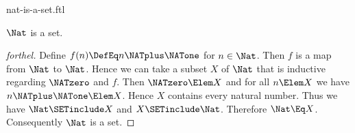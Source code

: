 \documentclass{stex}
\begin{document}
\begin{smodule}{nat-is-a-set.ftl}

\begin{proposition}[forthel]
  $\Nat$ is a set.
\end{proposition}
\begin{proof}[forthel]
  Define $f(n) \DefEq n \NATplus \NATone$ for $n \in \Nat$.
  Then $f$ is a map from $\Nat$ to $\Nat$.
  Hence we can take a subset $X$ of $\Nat$ that is inductive regarding
  $\NATzero$ and $f$.
  Then $\NATzero \Elem X$ and for all $n \Elem X$ we have $n \NATplus \NATone \Elem X$.
  Hence $X$ contains every natural number.
  Thus we have $\Nat \SETinclude X$ and $X \SETinclude \Nat$.
  Therefore $\Nat \Eq X$.
  Consequently $\Nat$ is a set.
\end{proof}
\end{smodule}
\end{document}
